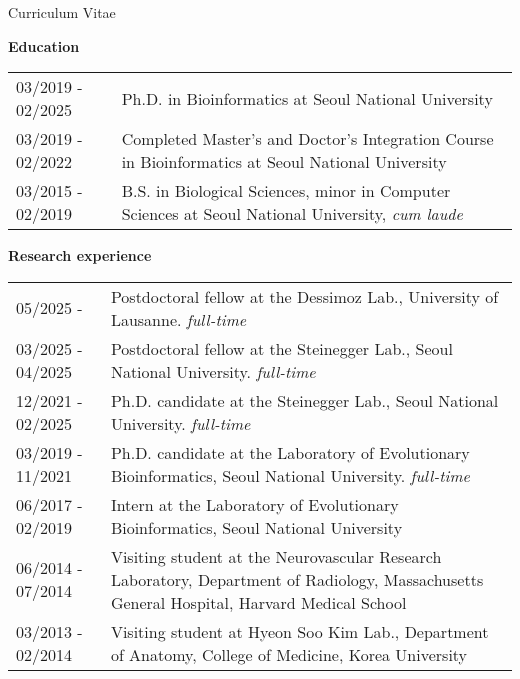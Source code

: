 \documentclass{resume} %
\newcommand{\subheading}[1]{%
  \vspace{0.5mm}%
  {\fontsize{11.5pt}{13pt}\selectfont\bfseries #1}%
  \vspace{1mm}%
}
\begin{document}


\setcounter{tocdepth}{1}

\pagestyle{plain}
\setcounter{page}{1}

\setlength{\oddsidemargin}{-0.2cm}
\setlength{\evensidemargin}{-0.2cm}
\setlength{\linewidth}{16.5cm}
\setlength{\textheight}{26cm}
\setlength{\tabcolsep}{0cm}


\begin{rSection}{Curriculum Vitae}
\vspace{1mm}

\subheading{Education}

\begin{tabular}{p{3.6cm}p{13.0cm}}
03/2019 - 02/2025 & Ph.D. in Bioinformatics at Seoul National University
\\[1.mm]
03/2019 - 02/2022 & Completed Master's and Doctor's Integration Course in Bioinformatics at Seoul National University
\\[1.mm]
03/2015 - 02/2019 & B.S. in Biological Sciences, minor in Computer Sciences at Seoul National University, \textit{cum laude}
\\[1mm]
\end{tabular}
\vspace{1mm}

\subheading{Research experience}

\begin{tabular}{p{3.6cm}p{13.0cm}}
05/2025 - & Postdoctoral fellow at the Dessimoz Lab., University of Lausanne. \textit{full-time}
\\[1.mm]
03/2025 - 04/2025 & Postdoctoral fellow at the Steinegger Lab., Seoul National University. \textit{full-time}
\\[1.mm]
12/2021 - 02/2025 & Ph.D. candidate at the Steinegger Lab., Seoul National University. \textit{full-time}
\\[1.mm]
03/2019 - 11/2021 & Ph.D. candidate at the Laboratory of Evolutionary Bioinformatics, Seoul National University. \textit{full-time}
\\[1.mm]
06/2017 - 02/2019 & Intern at the Laboratory of Evolutionary Bioinformatics, Seoul National University
\\[1.mm]
06/2014 - 07/2014 & Visiting student at the Neurovascular Research Laboratory, Department of Radiology, Massachusetts General Hospital, Harvard Medical School
\\[1.mm]
03/2013 - 02/2014 & Visiting student at Hyeon Soo Kim Lab., Department of Anatomy, College of Medicine, Korea University
\\[1.mm]
\end{tabular}
\vspace{1mm}
\end{rSection}
\end{document}
